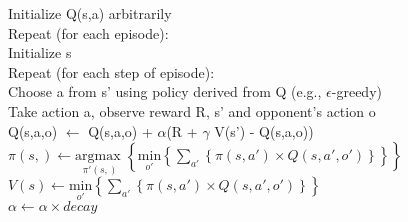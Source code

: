 \begin{center} 
\begin{mdframed}
\begin{algorithm}[H]
Initialize Q(s,a) arbitrarily \\
Repeat (for each episode):\\
\tab Initialize s \\
\tab Repeat (for each step of episode):\\
\dtab Choose a from s' using policy derived from Q (e.g., $\epsilon$-greedy)\\
\dtab Take action a, observe reward R, s' and opponent's action o\\
\dtab Q(s,a,o) $\leftarrow$ Q(s,a,o) + $\alpha $(R + $\gamma$ V(s') - Q(s,a,o))  \\
\dtab $\pi(s,) \leftarrow \underset{\pi'(s,)}{\text{argmax }} \left\{ \underset{o'}{\text{min}} \left\{ \sum_{a'}  \left\{ \pi(s,a') \times Q(s,a',o') \right\} \right\} \right\}$ \\
\dtab $ V(s) \leftarrow \underset{o'}{\text{min}} \left\{ \sum_{a'}  \left\{ \pi(s,a') \times Q(s,a',o') \right\} \right\}  $ \\
\dtab $\alpha \leftarrow \alpha \times decay$
\end{algorithm}
\end{mdframed}
\label{alg:minmax}
\end{center}


